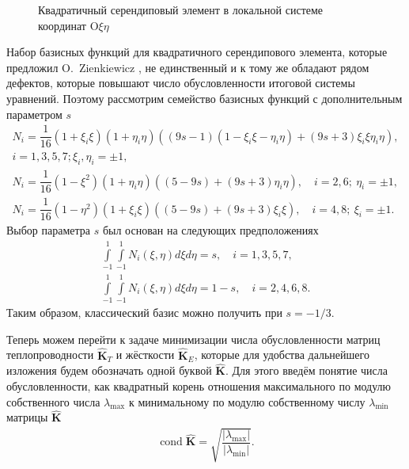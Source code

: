 \begin{figure}[ht]
    \caption{Квадратичный серендиповый элемент в локальной системе координат $\text{O}\xi\eta$}\label{fig:QuadraticSerendipity}
\end{figure}

Набор базисных функций для квадратичного серендипового элемента, которые предложил O.~Zienkiewicz \cite{Zienkiewicz}, не единственный и к тому же обладают рядом дефектов, которые повышают число обусловленности итоговой системы уравнений. Поэтому рассмотрим семейство базисных функций с дополнительным параметром $s$ \cite{QuadraticSerensipity}
\begin{gather*}
    N_i = \dfrac{1}{16} (1 + \xi_i \xi) (1 + \eta_i \eta) ((9s - 1) (1 - \xi_i \xi - \eta_i \eta) + (9s + 3) \xi_i \xi \eta_i \eta), \\ 
    i = 1, 3, 5, 7; \xi_i, \eta_i = \pm 1, \\
    N_i = \dfrac{1}{16} (1 - \xi^2) (1 + \eta_i \eta) ((5 - 9s) + (9s + 3)\eta_i \eta),
    \quad
    i = 2, 6; \ \eta_i = \pm 1, \\
    N_i = \dfrac{1}{16} (1 - \eta^2) (1 + \xi_i \xi) ((5 - 9s) + (9s + 3)\xi_i \xi),
    \quad
    i = 4, 8; \ \xi_i = \pm 1.
\end{gather*}
Выбор параметра $s$ был основан на следующих предположениях
\begin{gather*}
    \int\limits_{-1}^{1} \int\limits_{-1}^{1} N_i (\xi, \eta) d\xi d\eta = s,
    \quad
    i = 1, 3, 5, 7, \\
    \int\limits_{-1}^{1} \int\limits_{-1}^{1} N_i (\xi, \eta) d\xi d\eta = 1 - s,
    \quad
    i = 2, 4, 6, 8.
\end{gather*}
Таким образом, классический базис можно получить при $s = -1 / 3$.

Теперь можем перейти к задаче минимизации числа обусловленности матриц теплопроводности $\widehat{\textbf{K}}_T$ и жёсткости $\widehat{\textbf{K}}_E$, которые для удобства дальнейшего изложения будем обозначать одной буквой $\widehat{\textbf{K}}$. Для этого введём понятие числа обусловленности, как квадратный корень отношения максимального по модулю собственного числа $\lambda_{\max}$ к минимальному по модулю собственному числу $\lambda_{\min}$ матрицы $\widehat{\textbf{K}}$
\begin{gather}
	\label{eq:CondValue}
	\operatorname{cond} \widehat{\textbf{K}} = \sqrt{\dfrac{|\lambda_{\max}|}{|\lambda_{\min}|}}.
\end{gather}

